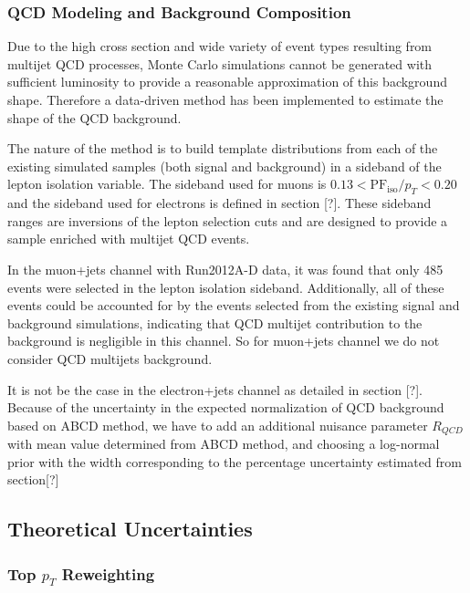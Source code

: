 \documentclass{cmspaperpdf}
\begin{document}
\subsubsection{QCD Modeling and Background Composition}

Due to the high cross section and wide variety of event types resulting from multijet QCD processes, Monte Carlo simulations cannot be generated with sufficient luminosity to provide a reasonable approximation of this background shape. Therefore a data-driven method has been implemented to estimate the shape of the QCD background.

The nature of the method is to build template distributions from each of the existing simulated samples (both signal and background) in a sideband of the lepton isolation variable. The sideband used for muons is $0.13<\mathrm{PF}_\mathrm{iso}/p_{T}<0.20$ and the sideband used for electrons is defined in section [?]. These sideband ranges are inversions of the lepton selection cuts and are designed to provide a sample enriched with multijet QCD events.

In the muon+jets channel with Run2012A-D data, it was found that only 485 events were selected in the lepton isolation sideband. Additionally, all of these events could be accounted for by the events selected from the existing signal and background simulations, indicating that QCD multijet contribution to the background is negligible in this channel. So for muon+jets channel we do not consider QCD multijets background.

It is not be the case in the electron+jets channel as detailed in section [?]. Because of the uncertainty in the expected normalization of QCD background based on ABCD method, we have to add an additional nuisance parameter $R_{QCD}$ with mean value determined from ABCD method, and choosing a log-normal prior with the width corresponding to the percentage uncertainty estimated from section[?] 

\subsection{Theoretical Uncertainties}

\subsubsection{Top $p_{T}$ Reweighting}
\end{document}
